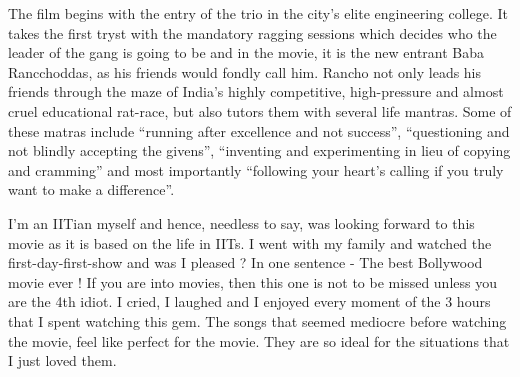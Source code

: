 \documentclass{article}
\begin{document}
The film begins with the entry of the trio in the city's elite engineering college. It takes the first tryst with the mandatory ragging sessions which decides who the leader of the gang is going to be and in the movie, it is the new entrant Baba Rancchoddas, as his friends would fondly call him. Rancho not only leads his friends through the maze of India's highly competitive, high-pressure and almost cruel educational rat-race, but also tutors them with several life mantras. Some of these matras include ``running after excellence and not success'', ``questioning and not blindly accepting the givens'', ``inventing and experimenting in lieu of copying and cramming'' and most importantly ``following your heart's calling if you truly want to make a difference''.


I'm an IITian myself and hence, needless to say, was looking forward to this movie as it is based on the life in IITs. I went with my family and watched the first-day-first-show and was I pleased ? In one sentence - The best Bollywood movie ever ! If you are into movies, then this one is not to be missed unless you are the 4th idiot. I cried, I laughed and I enjoyed every moment of the 3 hours that I spent watching this gem. The songs that seemed mediocre before watching the movie, feel like perfect for the movie. They are so ideal for the situations that I just loved them.
\end{document}
